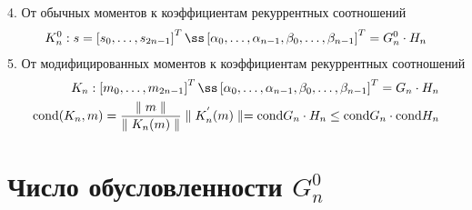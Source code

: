 4. От обычных моментов к коэффициентам рекуррентных соотношений
\begin{eqnarray}
K_n^{0}:s=\left[s_0,\ldots,s_{2n-1}\right]^{T} \ss \left[\alpha_0,\ldots,\alpha_{n-1},\beta_0,\ldots,\beta_{n-1}\right]^{T}=G_n^{0} \cdot {H_n} \nonumber
\end{eqnarray}
5. От модифицированных моментов к коэффициентам рекуррентных соотношений
\begin{eqnarray}
K_n:\left[m_0,\ldots,m_{2n-1}\right]^{T} \ss \left[\alpha_0,\ldots,\alpha_{n-1},\beta_0,\ldots,\beta_{n-1}\right]^{T}=G_n \cdot {H_n} \nonumber \\
\mbox{cond}(K_n,m)=\frac{\parallel m \parallel}{\parallel K_n(m)\parallel}\parallel K_n^{'}(m) \parallel
=\mbox{cond}G_n \cdot {H_n}\leq \mbox{cond}G_n \cdot\mbox{cond} {H_n} \nonumber
\end{eqnarray}

\section{Число обусловленности $G_n^{0}$}

